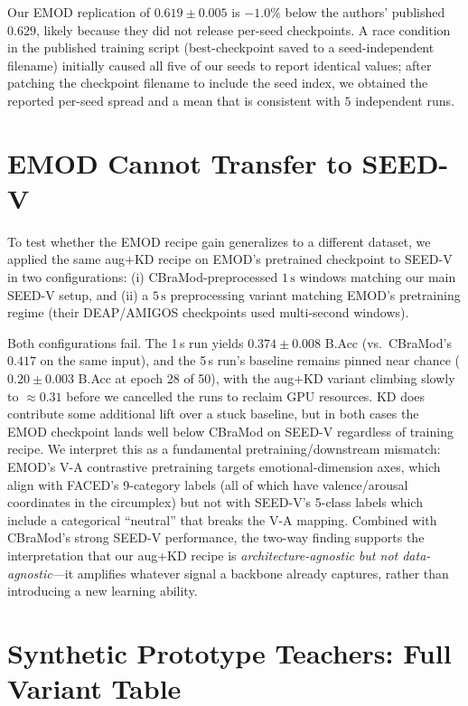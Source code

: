 Our EMOD replication of $0.619 \pm 0.005$ is $-1.0\%$ below the authors' published $0.629$, likely because they did not release per-seed checkpoints. A race condition in the published training script (best-checkpoint saved to a seed-independent filename) initially caused all five of our seeds to report identical values; after patching the checkpoint filename to include the seed index, we obtained the reported per-seed spread and a mean that is consistent with $5$ independent runs.

\section{EMOD Cannot Transfer to SEED-V}
\label{sec:supp_emod_seedv}

To test whether the EMOD recipe gain generalizes to a different dataset, we applied the same aug$+$KD recipe on EMOD's pretrained checkpoint to SEED-V in two configurations: (i) CBraMod-preprocessed $1\,\text{s}$ windows matching our main SEED-V setup, and (ii) a $5\,\text{s}$ preprocessing variant matching EMOD's pretraining regime (their DEAP/AMIGOS checkpoints used multi-second windows).

Both configurations fail. The 1\,s run yields $0.374 \pm 0.008$ B.Acc (vs.\ CBraMod's $0.417$ on the same input), and the 5\,s run's baseline remains pinned near chance ($0.20 \pm 0.003$ B.Acc at epoch 28 of 50), with the aug$+$KD variant climbing slowly to $\approx 0.31$ before we cancelled the runs to reclaim GPU resources. KD does contribute some additional lift over a stuck baseline, but in both cases the EMOD checkpoint lands well below CBraMod on SEED-V regardless of training recipe. We interpret this as a fundamental pretraining/downstream mismatch: EMOD's V-A contrastive pretraining targets emotional-dimension axes, which align with FACED's 9-category labels (all of which have valence/arousal coordinates in the circumplex) but not with SEED-V's 5-class labels which include a categorical ``neutral'' that breaks the V-A mapping. Combined with CBraMod's strong SEED-V performance, the two-way finding supports the interpretation that our aug+KD recipe is \emph{architecture-agnostic but not data-agnostic}---it amplifies whatever signal a backbone already captures, rather than introducing a new learning ability.

\section{Synthetic Prototype Teachers: Full Variant Table}
\label{sec:supp_synth_teachers}

